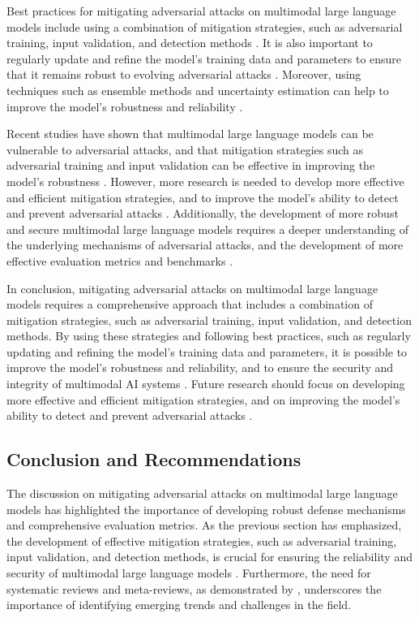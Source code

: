 \documentclass[11pt,a4paper]{article}
\begin{document}
Best practices for mitigating adversarial attacks on multimodal large language models include using a combination of mitigation strategies, such as adversarial training, input validation, and detection methods \cite{arxiv:2408.08632}. It is also important to regularly update and refine the model's training data and parameters to ensure that it remains robust to evolving adversarial attacks \cite{arxiv:2402.12750}. Moreover, using techniques such as ensemble methods and uncertainty estimation can help to improve the model's robustness and reliability \cite{arxiv:2412.02104}.

Recent studies have shown that multimodal large language models can be vulnerable to adversarial attacks, and that mitigation strategies such as adversarial training and input validation can be effective in improving the model's robustness \cite{arxiv:2410.18325}. However, more research is needed to develop more effective and efficient mitigation strategies, and to improve the model's ability to detect and prevent adversarial attacks \cite{arxiv:2402.14154}. Additionally, the development of more robust and secure multimodal large language models requires a deeper understanding of the underlying mechanisms of adversarial attacks, and the development of more effective evaluation metrics and benchmarks \cite{arxiv:2408.13257}.

In conclusion, mitigating adversarial attacks on multimodal large language models requires a comprehensive approach that includes a combination of mitigation strategies, such as adversarial training, input validation, and detection methods. By using these strategies and following best practices, such as regularly updating and refining the model's training data and parameters, it is possible to improve the model's robustness and reliability, and to ensure the security and integrity of multimodal AI systems \cite{arxiv:2409.18991}. Future research should focus on developing more effective and efficient mitigation strategies, and on improving the model's ability to detect and prevent adversarial attacks \cite{arxiv:2408.15769}.


\subsection{Conclusion and Recommendations}


The discussion on mitigating adversarial attacks on multimodal large language models has highlighted the importance of developing robust defense mechanisms and comprehensive evaluation metrics. As the previous section has emphasized, the development of effective mitigation strategies, such as adversarial training, input validation, and detection methods, is crucial for ensuring the reliability and security of multimodal large language models \cite{arxiv:2408.08632}. Furthermore, the need for systematic reviews and meta-reviews, as demonstrated by \cite{arxiv:2409.18991}, underscores the importance of identifying emerging trends and challenges in the field.
\end{document}
